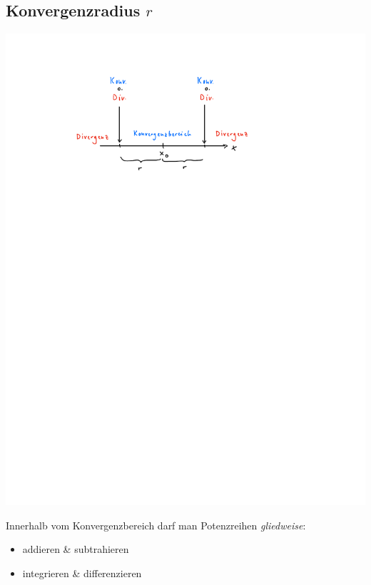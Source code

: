 \subsection{Konvergenzradius \texorpdfstring{\hfill $r\ $}{r}}
    \vspace{0.5em}
    \begin{center}
            \includegraphics[width=0.65\linewidth]{src/Potenzreihen/konvergenzradius.pdf}
    \end{center}
    Innerhalb vom Konvergenzbereich darf man Potenzreihen \textit{gliedweise}:
    \begin{itemize}
        \item addieren \& subtrahieren
        \item integrieren \& differenzieren
    \end{itemize}